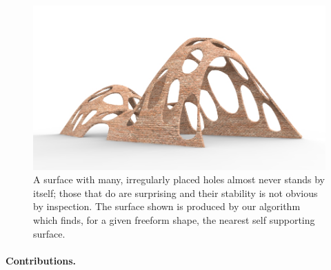 \documentclass[review]{acmsiggraph}
\begin{document}
	\begin{figure}[t] 
	\includegraphics[width=\columnwidth]{fig/cheesevault25.jpg} 
	\caption{A surface with many, irregularly placed holes almost 
never stands by itself; those that do are surprising and their stability 
is not obvious by inspection. The surface shown is produced by our 
algorithm which finds, for a given freeform shape, the nearest self\dash 
supporting surface.}
	\label{fig:cheese}
\end{figure}




\paragraph{Contributions.} 
\end{document}

